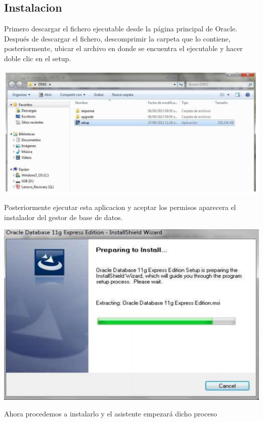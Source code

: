 \documentclass[12pt,letterpaper]{article}
\begin{document}
\subsection{Instalacion}
Primero descargar el fichero ejecutable desde la página principal de Oracle.
Después de descargar el fichero, descomprimir la carpeta que lo contiene,
posteriormente, ubicar el archivo en donde se encuentra el ejecutable y
hacer doble clic en el setup.
\begin{center}
\includegraphics[width=15cm]{./IMG/img1}
\end{center} 
Posteriormente ejecutar esta aplicacion y aceptar los permisos aparecera el
instalador del gestor de base de datos.
\begin{center}
\includegraphics[width=15cm]{./IMG/img2}
\end{center} 
Ahora procedemos a instalarlo y el asistente empezará dicho proceso
\end{document}
